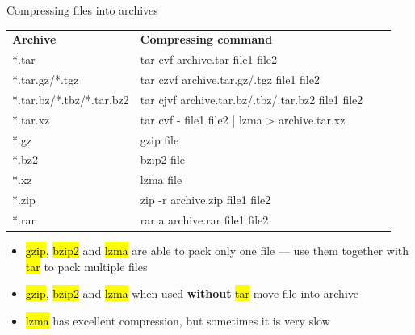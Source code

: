 \documentclass[compress, ucs, xelatex, 11pt, xcolor=svgnames,
  hyperref={
    bookmarks=true,
    unicode=true,
    colorlinks=true,
    pdftitle={Linux, command line and MetaCentrum},
    plainpages=false,
    pdfauthor={Vojtech Zeisek},
    pdfsubject={Course about use of Linux command line, writing shell scripts and using MetaCentrum of CESNET},
    pdfcreator={XeLaTeX, http://www.xelatex.org/},
    pdfkeywords={Linux, GNU, BASH, shell, command line, MetaCentrum},
    linkcolor=Sienna,
    anchorcolor=black,
    citecolor=green,
    filecolor=magenta,
    menucolor=Sienna,
    urlcolor=cyan,
    pdftex},
  url={hyphens, lowtilde} %
  ]{beamer}
\renewcommand{\texttt}[1]{\hl{\ttfamily #1}}
\begin{document}
\begin{frame}{Compressing files into archives}
\begin{center}
\begin{tabular}{llll}
\textbf{Archive} & \textbf{Compressing command}\\
*.tar & tar cvf archive.tar file1 file2\\
*.tar.gz\alert{/}*.tgz & tar czvf archive.tar.gz\alert{/}.tgz file1 file2\\
*.tar.bz\alert{/}*.tbz\alert{/}*.tar.bz2 & tar cjvf archive.tar.bz\alert{/}.tbz\alert{/}.tar.bz2 file1 file2\\
*.tar.xz & tar cvf - file1 file2 | lzma > archive.tar.xz\\
*.gz & gzip file\\
*.bz2 & bzip2 file\\
*.xz & lzma file\\
*.zip & zip -r archive.zip file1 file2\\
*.rar & rar a archive.rar file1 file2\\
\end{tabular}
\end{center}
\begin{itemize}
  \item \texttt{gzip}, \texttt{bzip2} and \texttt{lzma} are able to pack only one file --- use them together with \texttt{tar} to pack multiple files
  \item \texttt{gzip}, \texttt{bzip2} and \texttt{lzma} when used \textbf{without} \texttt{tar} \alert{move} file into archive
  \item \texttt{lzma} has excellent compression, but sometimes it is very slow
\end{itemize}
\end{frame}
\end{document}
